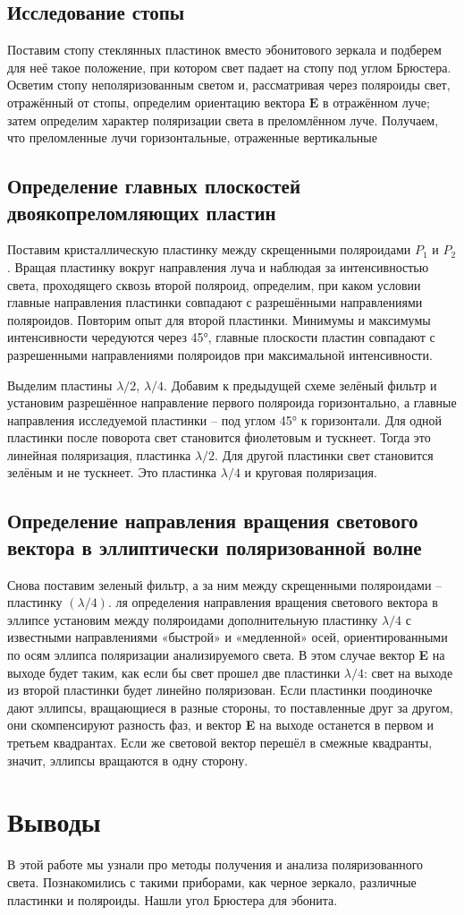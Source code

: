\documentclass[a4paper, 12pt]{article}
\begin{document}
\subsection{Исследование стопы}
Поставим стопу стеклянных пластинок вместо эбонитового зеркала и подберем для неё такое положение, при котором свет падает на стопу под углом Брюстера. Осветим стопу неполяризованным светом и, рассматривая через поляроиды свет, отражённый от стопы, определим ориентацию вектора $ \mathbf{E} $ в отражённом луче; затем определим характер поляризации света в преломлённом луче. Получаем, что преломленные лучи горизонтальные, отраженные вертикальные

\subsection{Определение главных плоскостей двоякопреломляющих пластин}
Поставим кристаллическую пластинку между скрещенными поляроидами $ P_1 $ и $ P_2 $. Вращая пластинку вокруг направления луча и наблюдая за интенсивностью света, проходящего сквозь второй поляроид, определим, при каком условии главные направления пластинки совпадают с разрешёнными направлениями поляроидов. Повторим опыт для второй пластинки. Минимумы и максимумы интенсивности чередуются через 45°, главные плоскости пластин совпадают с разрешенными направлениями поляроидов при максимальной интенсивности.

Выделим пластины $ \lambda / 2 $, $ \lambda / 4 $. Добавим к предыдущей схеме зелёный фильтр и установим разрешённое направление первого поляроида горизонтально, а главные направления исследуемой пластинки -- под углом 45° к горизонтали. Для одной пластинки после поворота свет становится фиолетовым и тускнеет. Тогда это линейная поляризация, пластинка $ \lambda / 2 $. Для другой пластинки свет становится зелёным и не тускнеет. Это пластинка $ \lambda / 4 $ и круговая поляризация.
\subsection{Определение направления вращения светового вектора в эллиптически поляризованной волне}
Снова поставим зеленый фильтр, а за ним между скрещенными поляроидами -- пластинку $( \lambda / 4 )$.
ля определения направления вращения светового вектора в эллипсе установим между поляроидами дополнительную пластинку $ \lambda / 4 $ с известными направлениями «быстрой» и «медленной» осей, ориентированными по осям эллипса поляризации анализируемого света. В этом случае вектор \textbf{E} на выходе будет таким, как если бы свет прошел две пластинки $ \lambda / 4 $: свет на выходе из второй пластинки будет линейно поляризован. Если пластинки поодиночке дают эллипсы, вращающиеся в разные стороны, то поставленные друг за другом, они скомпенсируют разность фаз, и вектор \textbf{E} на выходе останется в первом и третьем квадрантах. Если же световой вектор перешёл в смежные квадранты, значит, эллипсы вращаются в одну сторону.

\section{Выводы}

В этой работе мы узнали про методы получения и анализа поляризованного света. Познакомились с такими приборами, как черное зеркало, различные пластинки и поляроиды. Нашли угол Брюстера для эбонита.
\end{document}
